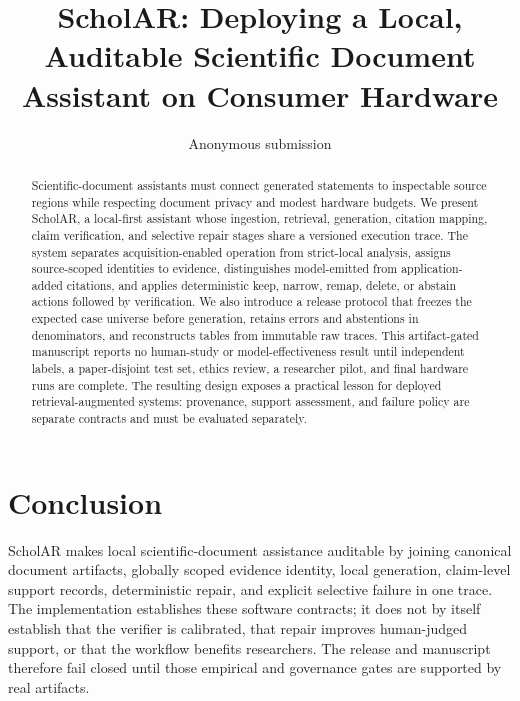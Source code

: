 \documentclass[11pt]{article}
\title{ScholAR: Deploying a Local, Auditable Scientific Document Assistant on Consumer Hardware}
\author{Anonymous submission}
\begin{document}
\maketitle
\begin{abstract}
Scientific-document assistants must connect generated statements to inspectable source regions while respecting document privacy and modest hardware budgets. We present ScholAR, a local-first assistant whose ingestion, retrieval, generation, citation mapping, claim verification, and selective repair stages share a versioned execution trace. The system separates acquisition-enabled operation from strict-local analysis, assigns source-scoped identities to evidence, distinguishes model-emitted from application-added citations, and applies deterministic keep, narrow, remap, delete, or abstain actions followed by verification. We also introduce a release protocol that freezes the expected case universe before generation, retains errors and abstentions in denominators, and reconstructs tables from immutable raw traces. This artifact-gated manuscript reports no human-study or model-effectiveness result until independent labels, a paper-disjoint test set, ethics review, a researcher pilot, and final hardware runs are complete. The resulting design exposes a practical lesson for deployed retrieval-augmented systems: provenance, support assessment, and failure policy are separate contracts and must be evaluated separately.
\end{abstract}








\section{Conclusion}
ScholAR makes local scientific-document assistance auditable by joining canonical document artifacts, globally scoped evidence identity, local generation, claim-level support records, deterministic repair, and explicit selective failure in one trace. The implementation establishes these software contracts; it does not by itself establish that the verifier is calibrated, that repair improves human-judged support, or that the workflow benefits researchers. The release and manuscript therefore fail closed until those empirical and governance gates are supported by real artifacts.
\label{content:end}






\appendix

\end{document}
